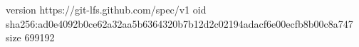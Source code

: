 version https://git-lfs.github.com/spec/v1
oid sha256:ad0e4092b0ce62a32aa5b6364320b7b12d2c02194adacf6e00ecfb8b00c8a747
size 699192
